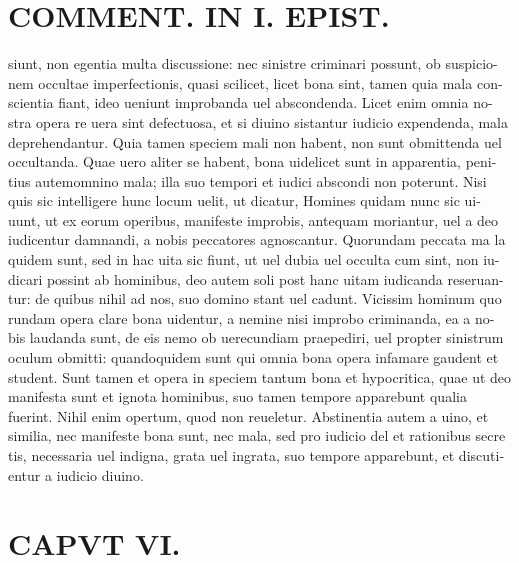 \documentclass{article}
\begin{document}
\begin{pages}
\section*{COMMENT. IN I. EPIST. }
\marginpar{[ p.528 ]}\pstart siunt, non egentia multa discussione: nec sinistre criminari possunt, ob suspicio- nem occultae imperfectionis, quasi scilicet, licet bona sint, tamen quia mala con- scientia fiant, ideo ueniunt improbanda uel abscondenda. Licet enim omnia no- stra opera re uera sint defectuosa, et si diuino sistantur iudicio expendenda, mala deprehendantur. Quia tamen speciem mali non habent, non sunt obmittenda uel occultanda. Quae uero aliter se habent, bona uidelicet sunt in apparentia, peni- tius autemomnino mala; illa suo tempori et iudici abscondi non poterunt. Nisi quis sic intelligere hunc locum uelit, ut dicatur, Homines quidam nunc sic ui- uunt, ut ex eorum operibus, manifeste improbis, antequam moriantur, uel a deo iudicentur damnandi, a nobis peccatores agnoscantur. Quorundam peccata ma la quidem sunt, sed in hac uita sic fiunt, ut uel dubia uel occulta cum sint, non iu- dicari possint ab hominibus, deo autem soli post hanc uitam iudicanda reseruan- tur: de quibus nihil ad nos, suo domino stant uel cadunt. Vicissim hominum quo rundam opera clare bona uidentur, a nemine nisi improbo criminanda, ea a no- bis laudanda sunt, de eis nemo ob uerecundiam praepediri, uel propter sinistrum oculum obmitti: quandoquidem sunt qui omnia bona opera infamare gaudent et student. Sunt tamen et opera in speciem tantum bona et hypocritica, quae ut deo manifesta sunt et ignota hominibus, suo tamen tempore apparebunt qualia fuerint. Nihil enim opertum, quod non reueletur. Abstinentia autem a uino, et similia, nec manifeste bona sunt, nec mala, sed pro iudicio del et rationibus secre tis, necessaria uel indigna, grata uel ingrata, suo tempore apparebunt, et discuti- entur a iudicio diuino.  \pend
\endnumbering\beginnumbering\section{CAPVT VI.}
{}

\end{pages}
\end{document}
